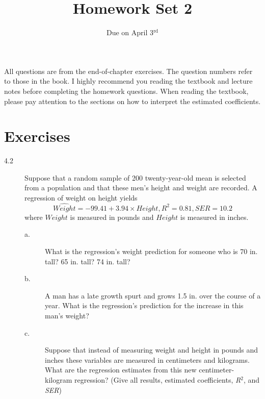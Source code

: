 \documentclass[a4paper,11pt]{article}
\date{Due on April 3\(^{\text{rd}}\)}
\title{Homework Set 2}
\begin{document}
\maketitle
All questions are from the end-of-chapter exercises. The question
numbers refer to those in the book. I highly recommend you reading the
textbook and lecture notes before completing the homework
questions. When reading the textbook, please pay attention to the
sections on how to interpret the estimated coefficients.

\section*{Exercises}
\label{sec:org946a368}

\begin{description}
\item[{4.2}] Suppose that a random sample of 200 twenty-year-old mean is
selected from a population and that these men's height and
weight are recorded. A regression of weight on height yields
\begin{equation*}
\widehat{Weight} = -99.41 + 3.94 \times Height, R^2 = 0.81, SER = 10.2
\end{equation*}
where \(Weight\) is measured in pounds and \(Height\) is measured
in inches.
\begin{description}
\item[{a.}] What is the regression's weight prediction for someone who
is 70 in. tall? 65 in. tall? 74 in. tall?
\item[{b.}] A man has a late growth spurt and grows 1.5 in. over the
course of a year. What is the regression's prediction for
the increase in this man's weight?
\item[{c.}] Suppose that instead of measuring weight and height in
pounds and inches these variables are measured in
centimeters and kilograms. What are the regression estimates
from this new centimeter-kilogram regression? (Give all
results, estimated coefficients, \emph{R\(^{\text{2}}\)}, and \emph{SER})
\end{description}
\end{description}

\vspace{0.5cm}
\end{document}
